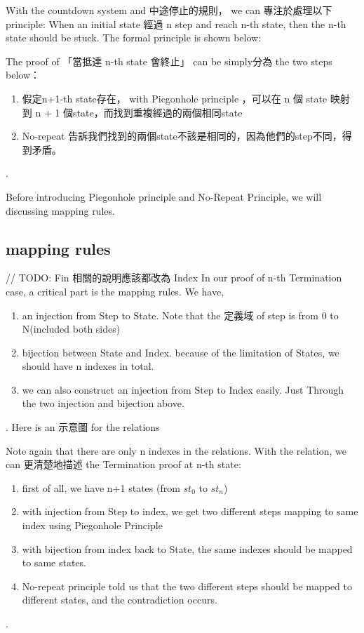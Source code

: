 With the countdown system and 中途停止的規則， we can 專注於處理以下 principle:
When an initial state 經過 n step and reach n-th state, then the n-th state should be stuck.
The formal principle is shown below:




The proof of 「當抵達 n-th state 會終止」 can be simply分為 the two steps below：
\begin{enumerate}[1.]
    \item 假定n+1-th state存在， with Piegonhole principle ，可以在 n 個 state 映射到 n + 1 個state，而找到重複經過的兩個相同state
    \item No-repeat 告訴我們找到的兩個state不該是相同的，因為他們的step不同，得到矛盾。
\end{enumerate}.

Before introducing Piegonhole principle and No-Repeat Principle, we will discussing mapping rules.

\subsection{ mapping rules }
// TODO: Fin 相關的說明應該都改為 Index
In our proof of n-th Termination case, a critical part is the mapping rules.
We have,
\begin{enumerate}[1.]
    \item an injection from Step to State.  Note that the 定義域 of step is from 0 to N(included both sides)
    \item bijection between State and Index. because of the limitation of States, we should have n indexes in total.
    \item we can also construct an injection from Step to Index easily.  Just Through the two injection and bijection above.
\end{enumerate}.
Here is an 示意圖 for the relations


Note again that there are only n indexes in the relations.
With the relation, we can 更清楚地描述 the Termination proof at n-th state:
\begin{enumerate}[1.]
    \item first of all, we have n+1 states (from $st_{0}$ to $st_{n}$)
    \item with injection from Step to index, we get two different steps mapping to same index using Piegonhole Principle
    \item with bijection from index back to State, the same indexes should be mapped to same states.
    \item No-repeat principle told us that the two different steps should be mapped to different states, and the contradiction occurs.
\end{enumerate}.

